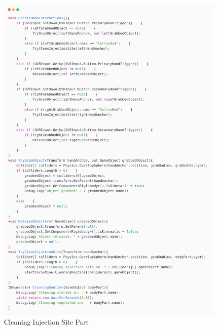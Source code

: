 \begin{figure}[h] 
	\centering
	\includegraphics[width=1\textwidth, height=0.7\textheight]{Images/cleaning1.png}
	\caption{Cleaning Injection Site Part}
	\label{fig:Cleaning Injection Site Part}
\end{figure}
\newpage

